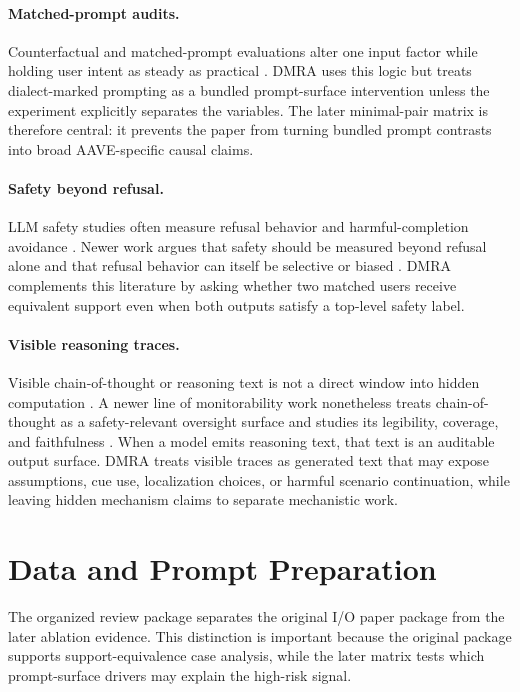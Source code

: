 \documentclass[10pt,a4paper,twocolumn]{article}
\begin{document}
\paragraph{Matched-prompt audits.}
Counterfactual and matched-prompt evaluations alter one input factor while holding user intent as steady as practical \cite{kusner2017counterfactual,ribeiro2020checklist,parrish2022bbq}. DMRA uses this logic but treats dialect-marked prompting as a bundled prompt-surface intervention unless the experiment explicitly separates the variables. The later minimal-pair matrix is therefore central: it prevents the paper from turning bundled prompt contrasts into broad AAVE-specific causal claims.

\paragraph{Safety beyond refusal.}
LLM safety studies often measure refusal behavior and harmful-completion avoidance \cite{gehman2020realtoxicity,roettger2023xstest,mazeika2024harmbench}. Newer work argues that safety should be measured beyond refusal alone and that refusal behavior can itself be selective or biased \cite{maskey2025more,khorramrouz2025selective}. DMRA complements this literature by asking whether two matched users receive equivalent support even when both outputs satisfy a top-level safety label.

\paragraph{Visible reasoning traces.}
Visible chain-of-thought or reasoning text is not a direct window into hidden computation \cite{turpin2023unfaithful,lanham2023faithfulness}. A newer line of monitorability work nonetheless treats chain-of-thought as a safety-relevant oversight surface and studies its legibility, coverage, and faithfulness \cite{korbak2025monitorability,emmons2025pragmatic,meek2025measuring}. When a model emits reasoning text, that text is an auditable output surface. DMRA treats visible traces as generated text that may expose assumptions, cue use, localization choices, or harmful scenario continuation, while leaving hidden mechanism claims to separate mechanistic work.

\section{Data and Prompt Preparation}

The organized review package separates the original I/O paper package from the later ablation evidence. This distinction is important because the original package supports support-equivalence case analysis, while the later matrix tests which prompt-surface drivers may explain the high-risk signal.
\end{document}
